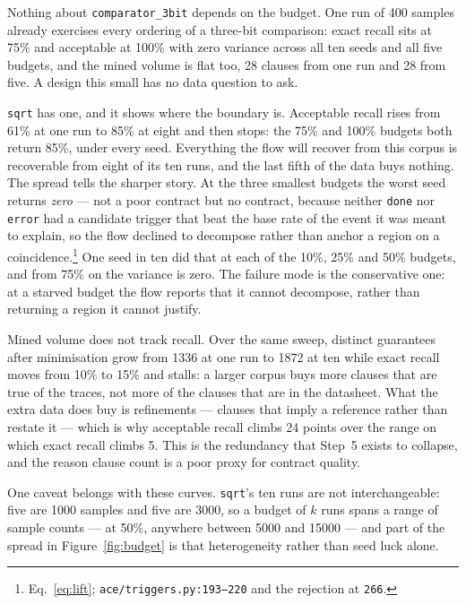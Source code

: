 Nothing about \texttt{comparator\_3bit} depends on the budget. One run of 400 samples already
exercises every ordering of a three-bit comparison: exact recall sits at 75\% and acceptable at
100\% with zero variance across all ten seeds and all five budgets, and the mined volume is
flat too, 28 clauses from one run and 28 from five. A design this small has no data question to
ask.

\texttt{sqrt} has one, and it shows where the boundary is. Acceptable recall rises from 61\% at
one run to 85\% at eight and then stops: the 75\% and 100\% budgets both return 85\%, under
every seed. Everything the flow will recover from this corpus is recoverable from eight of its
ten runs, and the last fifth of the data buys nothing. The spread tells the sharper story. At
the three smallest budgets the worst seed returns \emph{zero} --- not a poor contract but no
contract, because neither \texttt{done} nor \texttt{error} had a candidate trigger that beat the
base rate of the event it was meant to explain, so the flow declined to decompose rather than
anchor a region on a coincidence.\footnote{Eq.~\ref{eq:lift}; \texttt{ace/triggers.py:193--220}
and the rejection at \texttt{266}.} One seed in ten did that at each of the 10\%, 25\% and 50\%
budgets, and from 75\% on the variance is zero. The failure mode is the conservative one: at a
starved budget the flow reports that it cannot decompose, rather than returning a region it
cannot justify.

Mined volume does not track recall. Over the same sweep, distinct guarantees after minimisation
grow from 1336 at one run to 1872 at ten while exact recall moves from 10\% to 15\% and stalls:
a larger corpus buys more clauses that are true of the traces, not more of the clauses that are
in the datasheet. What the extra data does buy is refinements --- clauses that imply a reference
rather than restate it --- which is why acceptable recall climbs 24 points over the range on
which exact recall climbs 5. This is the redundancy that Step~5 exists to collapse, and the
reason clause count is a poor proxy for contract quality.

One caveat belongs with these curves. \texttt{sqrt}'s ten runs are not interchangeable: five are
1000 samples and five are 3000, so a budget of $k$ runs spans a range of sample counts --- at
50\%, anywhere between 5000 and 15000 --- and part of the spread in Figure~\ref{fig:budget} is
that heterogeneity rather than seed luck alone.

